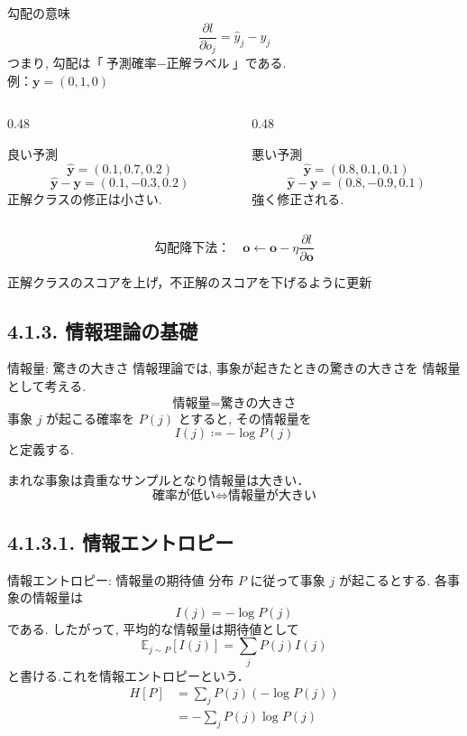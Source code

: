 \documentclass[dvipdfmx,uplatex,11pt]{beamer}
\begin{document}
\begin{frame}{勾配の意味}
\[
\boxed{
\frac{\partial l}{\partial o_j}
=
\hat y_j-y_j
}
\]
つまり, 勾配は「$\text{予測確率} - \text{正解ラベル}$」である. \\
例：$\bm y = (0,1,0)$ 
\small{
\begin{columns}[T,onlytextwidth]
\begin{column}{0.48\textwidth}
\begin{d2lbox}{良い予測}
\[
\hat{\bm y}=(0.1,0.7,0.2)
\]
\[\hat{\bm y}-\bm y
=
(0.1,-0.3,0.2)
\]
正解クラスの修正は小さい.
\end{d2lbox}
\end{column}

\begin{column}{0.48\textwidth}
\begin{d2lbox}{悪い予測}
\[
\hat{\bm y}=(0.8,0.1,0.1)
\]
\[\hat{\bm y}-\bm y
=
(0.8,-0.9,0.1)
\]
 強く修正される.
\end{d2lbox}
\end{column}
\end{columns}}
\[
\text{勾配降下法：}\quad \bm{o} \leftarrow \bm{o} - \eta \frac{\partial l}{\partial \bm{o}}
\]
\begin{d2lplainbox}
  正解クラスのスコアを上げ，不正解のスコアを下げるように更新
\end{d2lplainbox}

\end{frame}

\subsection{4.1.3. 情報理論の基礎}
\begin{frame}{情報量: 驚きの大きさ}
情報理論では, 事象が起きたときの\alert{驚きの大きさ}を
情報量として考える.
\[
\text{情報量}
=
\text{驚きの大きさ}
\]
事象 $j$ が起こる確率を $P(j)$ とすると, その情報量を
\[
\boxed{
I(j)
\coloneqq
-\log P(j)
}
\]
と定義する.
\begin{d2lplainbox}
まれな事象は貴重なサンプルとなり情報量は大きい．
\[
\text{確率が低い} \Leftrightarrow \text{情報量が大きい}
\]
\end{d2lplainbox}
\end{frame}

\subsection{4.1.3.1. 情報エントロピー}
\begin{frame}{情報エントロピー: 情報量の期待値}
分布 $P$ に従って事象 $j$ が起こるとする.
各事象の情報量は
\[
I(j)=-\log P(j)
\]
である.
したがって, 平均的な情報量は期待値として
\[
\mathbb{E}_{j\sim P}[I(j)]
=
\sum_j P(j)I(j)
\]
と書ける.これを\alert{情報エントロピー}という．
\[
\boxed{
\begin{aligned}
H[P]
&=
\sum_j P(j)(-\log P(j)) \\
&=
-\sum_j P(j)\log P(j)
\end{aligned}
}
\]

\end{frame}
\end{document}
